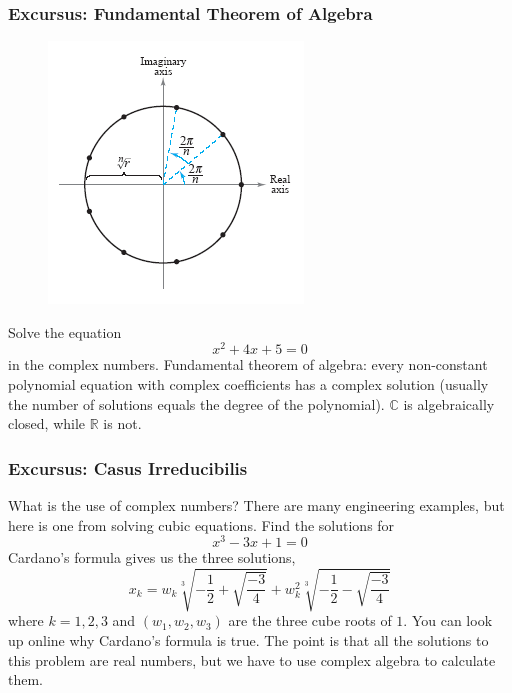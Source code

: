 \documentclass[xcolor=dvipsnames]{beamer}
\begin{document}
\begin{frame}
  \frametitle{Excursus: Fundamental Theorem of Algebra}
    \begin{figure}[h]
    \includegraphics[scale=0.5]{./diagrams/comproot.png}
  \end{figure}
  {\ubung} Solve the equation
  \begin{equation}
    \label{eq:phoojahs}
    x^{2}+4x+5=0
  \end{equation}
  in the complex numbers. Fundamental theorem of algebra: every
  non-constant polynomial equation with complex coefficients has a
  complex solution (usually the number of solutions equals the degree
  of the polynomial). $\mathbb{C}$ is algebraically closed, while
  $\mathbb{R}$ is not.
\end{frame}

\begin{frame}
  \frametitle{Excursus: Casus Irreducibilis}
  What is the use of complex numbers? There are many engineering
  examples, but here is one from solving cubic equations. Find the
  solutions for
  \begin{equation}
    \label{eq:oozaechi}
    x^{3}-3x+1=0
  \end{equation}
  Cardano's formula gives us the three solutions,
  \begin{equation}
    \label{eq:iejopice}
    x_{k}=w_{k}\sqrt[3]{-\frac{1}{2}+\sqrt{\frac{-3}{4}}}+w_{k}^{2}\sqrt[3]{-\frac{1}{2}-\sqrt{\frac{-3}{4}}}
  \end{equation}
  where $k=1,2,3$ and $(w_{1},w_{2},w_{3})$ are the three cube roots
  of $1$. You can look up online why Cardano's formula is true. The
  point is that all the solutions to this problem are real numbers,
  but we have to use complex algebra to calculate them.
\end{frame}
\end{document}
